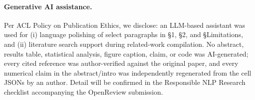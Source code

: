 \documentclass[11pt]{article}
\begin{document}
\paragraph{Generative AI assistance.} Per ACL Policy on Publication Ethics, we disclose: an LLM-based assistant was used for (i) language polishing of select paragraphs in \S1, \S2, and \S Limitations, and (ii) literature search support during related-work compilation. No abstract, results table, statistical analysis, figure caption, claim, or code was AI-generated; every cited reference was author-verified against the original paper, and every numerical claim in the abstract/intro was independently regenerated from the cell JSONs by an author. Detail will be confirmed in the Responsible NLP Research checklist accompanying the OpenReview submission.


\end{document}
